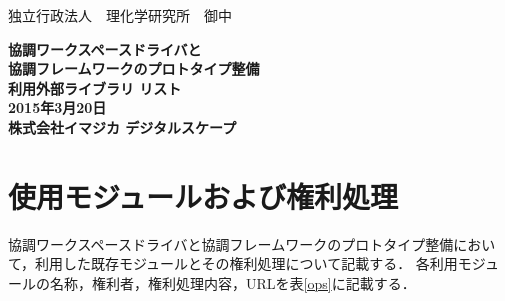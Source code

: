 \documentclass[a4paper,10pt,oneside]{jsbook}
\begin{document}
\begin{titlepage}
\noindent
独立行政法人　理化学研究所　御中
\begin{center}
	\vspace{8cm}
	{\Huge \textbf{協調ワークスペースドライバと\\協調フレームワークのプロトタイプ整備} } \\
	\vspace{1cm}
	{\Huge \textbf{利用外部ライブラリ リスト}} \\
	\vspace{10cm}
	{\Large \textbf{2015年3月20日}} \\
	\vspace{0.5cm}
	{\Large \textbf{株式会社イマジカ デジタルスケープ}}
\end{center}
\end{titlepage}

\tableofcontents

\chapter{使用モジュールおよび権利処理}
協調ワークスペースドライバと協調フレームワークのプロトタイプ整備において，利用した既存モジュールとその権利処理について記載する．
各利用モジュールの名称，権利者，権利処理内容，URLを表\ref{ops}に記載する．
\end{document}

